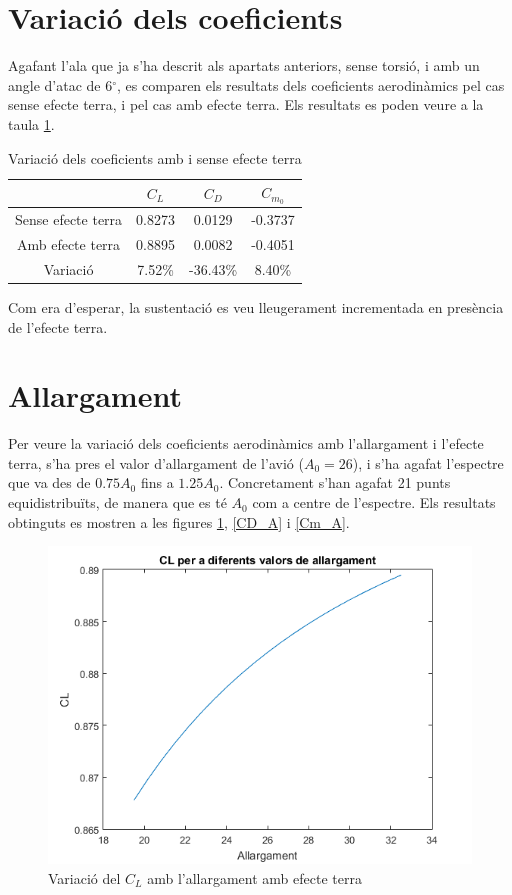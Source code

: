 \section{Variació dels coeficients}

Agafant l'ala que ja s'ha descrit als apartats anteriors, sense torsió, i amb un angle d'atac de 6$^{\circ}$, es comparen els resultats dels coeficients aerodinàmics pel cas sense efecte terra, i pel cas amb efecte terra. Els resultats es poden veure a la taula \ref{NoGroundvsGround}.

\begin{table} [H]
	\centering
	\begin{tabular}{| c | c | c | c |}	
		\hline
		& $C_{L}$ & $C_{D}$ & $C_{m_{0}}$ \\
		\hline
		Sense efecte terra & 0.8273 & 0.0129 & -0.3737 \\
		\hline
		Amb efecte terra & 0.8895 & 0.0082 & -0.4051 \\
		\hline	
		Variació & 7.52\% & -36.43\% & 8.40\% \\
		\hline
	\end{tabular}
\caption{Variació dels coeficients amb i sense efecte terra} \label{NoGroundvsGround}
\end{table}
Com era d'esperar, la sustentació es veu lleugerament incrementada en presència de l'efecte terra.
\section{Allargament}

Per veure la variació dels coeficients aerodinàmics amb l'allargament i l'efecte terra, s'ha pres el valor d'allargament de l'avió ($A_{0}=26$), i s'ha agafat l'espectre que va des de $0.75A_{0}$ fins a $1.25A_{0}$. Concretament s'han agafat 21 punts equidistribuïts, de manera que es té $A_{0}$ com a centre de l'espectre. Els resultats obtinguts es mostren a les figures \ref{CL_A}, \ref{CD_A} i \ref{Cm_A}.

\begin{figure}[H]
	\centering
	\includegraphics[scale=0.9]{./plots/CL_A}
	\caption{Variació del $C_{L}$ amb l'allargament amb efecte terra}
	\label{CL_A}
\end{figure}

